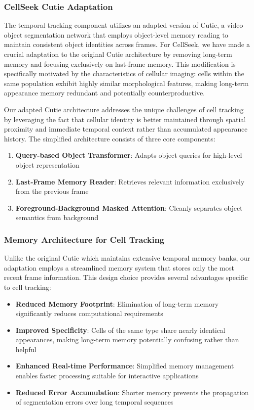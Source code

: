 \documentclass[12pt]{article}
\begin{document}
\subsubsection{CellSeek Cutie Adaptation}

The temporal tracking component utilizes an adapted version of Cutie, a video object segmentation network that employs object-level memory reading to maintain consistent object identities across frames. For CellSeek, we have made a crucial adaptation to the original Cutie architecture by removing long-term memory and focusing exclusively on last-frame memory. This modification is specifically motivated by the characteristics of cellular imaging: cells within the same population exhibit highly similar morphological features, making long-term appearance memory redundant and potentially counterproductive.

Our adapted Cutie architecture addresses the unique challenges of cell tracking by leveraging the fact that cellular identity is better maintained through spatial proximity and immediate temporal context rather than accumulated appearance history. The simplified architecture consists of three core components:

\begin{enumerate}
  \item \textbf{Query-based Object Transformer}: Adapts object queries for high-level object representation
  \item \textbf{Last-Frame Memory Reader}: Retrieves relevant information exclusively from the previous frame
  \item \textbf{Foreground-Background Masked Attention}: Cleanly separates object semantics from background
\end{enumerate}

\subsubsection{Memory Architecture for Cell Tracking}

Unlike the original Cutie which maintains extensive temporal memory banks, our adaptation employs a streamlined memory system that stores only the most recent frame information. This design choice provides several advantages specific to cell tracking:

\begin{itemize}
  \item \textbf{Reduced Memory Footprint}: Elimination of long-term memory significantly reduces computational requirements
  \item \textbf{Improved Specificity}: Cells of the same type share nearly identical appearances, making long-term memory potentially confusing rather than helpful
  \item \textbf{Enhanced Real-time Performance}: Simplified memory management enables faster processing suitable for interactive applications
  \item \textbf{Reduced Error Accumulation}: Shorter memory prevents the propagation of segmentation errors over long temporal sequences
\end{itemize}
\end{document}

